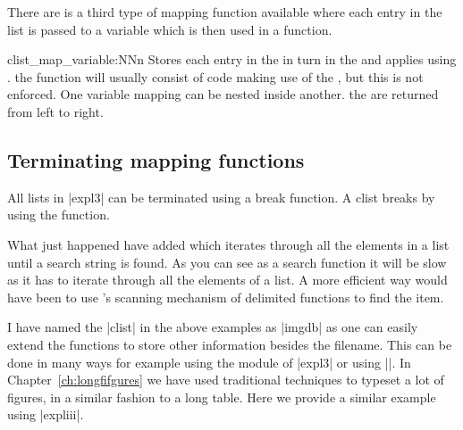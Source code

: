 There are is a third type of mapping function available where each entry in the list is passed to a variable which is then used in a function.

\begin{docCommand}{clist_map_variable:NNn}{  }
Stores each entry in the  in turn in the  and applies  using . the function will usually consist of code making use of the , but this is not enforced. One variable mapping can be nested inside another. the  are returned from left to right.
\end{docCommand}

\subsection{Terminating mapping functions}

All lists in |expl3| can be terminated using a break function. A clist breaks by using the  function. 


What just happened have added  which iterates through all the elements in a list until a search string is found. As you can see as a search function it will be slow as it has to iterate through all the elements of a list. A more efficient way would have been to use \tex’s scanning mechanism of delimited functions to find the item. 

I have named the |clist| in the above examples as |imgdb| as one can easily extend the functions to store other information besides the filename. This can be done in many ways for example using the  module of |expl3| or using |\csname|. In Chapter~\ref{ch:longfifgures}  we have used traditional techniques to typeset a lot of figures, in a similar fashion to a long table. Here we provide a similar example using |expliii|.

